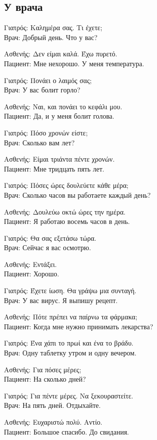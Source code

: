 \documentclass[12pt]{article}
\newcommand{\my}[1]{\textcolor{gray!80!white}{#1}}
\newenvironment{page}{\clearpage\normalsize\null\vfill}{\vfill\null}
\newenvironment{textblock}{\begin{minipage}{\textwidth}}{\end{minipage}\smallskip}
\newcommand{\dialogright}[2]{%
	\par\begingroup\raggedleft
	#1\\
	\my{#2}\par
	\endgroup
}
\begin{document}
	\begin{page}
		\subsection{У врача}
		\scriptsize
		\begin{textblock}
			Γιατρός: Καλημέρα σας. Τι έχετε;\\
			\my{Врач: Добрый день. Что у вас?}
			
			\dialogright{Ασθενής: Δεν είμαι καλά. Έχω πυρετό.}{Пациент: Мне нехорошо. У меня температура.}
			
			Γιατρός: Πονάει ο λαιμός σας;\\
			\my{Врач: У вас болит горло?}
			
			\dialogright{Ασθενής: Ναι, και πονάει το κεφάλι μου.}{Пациент: Да, и у меня болит голова.}
			
			Γιατρός: Πόσο χρονών είστε;\\
			\my{Врач: Сколько вам лет?}
			
			\dialogright{Ασθενής: Είμαι τριάντα πέντε χρονών.}{Пациент: Мне тридцать пять лет.}
			
			Γιατρός: Πόσες ώρες δουλεύετε κάθε μέρα;\\
			\my{Врач: Сколько часов вы работаете каждый день?}
			
			\dialogright{Ασθενής: Δουλεύω οκτώ ώρες την ημέρα.}{Пациент: Я работаю восемь часов в день.}
			
			Γιατρός: Θα σας εξετάσω τώρα.\\
			\my{Врач: Сейчас я вас осмотрю.}
			
			\dialogright{Ασθενής: Εντάξει.}{Пациент: Хорошо.}
			
			Γιατρός: Έχετε ίωση. Θα γράψω μια συνταγή.\\
			\my{Врач: У вас вирус. Я выпишу рецепт.}
			
			\dialogright{Ασθενής: Πότε πρέπει να παίρνω τα φάρμακα;}{Пациент: Когда мне нужно принимать лекарства?}
			
			Γιατρός: Ένα χάπι το πρωί και ένα το βράδυ.\\
			\my{Врач: Одну таблетку утром и одну вечером.}
			
			\dialogright{Ασθενής: Για πόσες μέρες;}{Пациент: На сколько дней?}
			
			Γιατρός: Για πέντε μέρες. Να ξεκουραστείτε.\\
			\my{Врач: На пять дней. Отдыхайте.}
			
			\dialogright{Ασθενής: Ευχαριστώ πολύ. Αντίο.}{Пациент: Большое спасибо. До свидания.}
		\end{textblock}
	\end{page}
\end{document}
